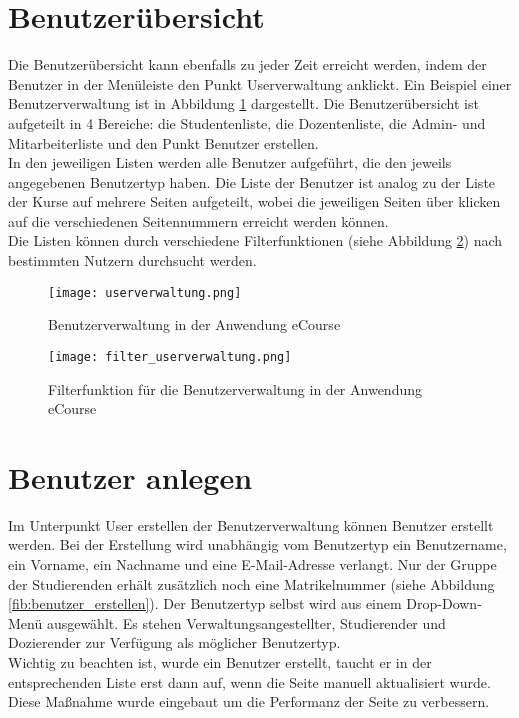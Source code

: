 \section{Benutzerübersicht}
Die Benutzerübersicht kann ebenfalls zu jeder Zeit erreicht werden, indem der Benutzer in der Menüleiste den Punkt \glqq Userverwaltung\grqq{} anklickt. Ein Beispiel einer Benutzerverwaltung ist in Abbildung \ref{fib:userverwaltung} dargestellt.
Die Benutzerübersicht ist aufgeteilt in 4 Bereiche: die Studentenliste, die Dozentenliste, die Admin- und Mitarbeiterliste und den Punkt Benutzer erstellen. \\
In den jeweiligen Listen werden alle Benutzer aufgeführt, die den jeweils angegebenen Benutzertyp haben. Die Liste der Benutzer ist analog zu der Liste der Kurse auf mehrere Seiten aufgeteilt, wobei die jeweiligen Seiten über klicken auf die verschiedenen Seitennummern erreicht werden können.\\
Die Listen können durch verschiedene Filterfunktionen (siehe Abbildung \ref{fib:filter}) nach bestimmten Nutzern durchsucht werden. 
\begin{figure}[h]
\centering
\texttt{[image: userverwaltung.png]}
\caption{Benutzerverwaltung in der Anwendung eCourse}
\label{fib:userverwaltung}
\end{figure}

\begin{figure}[h]
\centering
\texttt{[image: filter\_userverwaltung.png]}
\caption{Filterfunktion für die Benutzerverwaltung in der Anwendung eCourse}
\label{fib:filter}
\end{figure}


\section{Benutzer anlegen}
Im Unterpunkt \glqq User erstellen\grqq\: der Benutzerverwaltung können Benutzer erstellt werden. Bei der Erstellung wird unabhängig vom Benutzertyp ein Benutzername, ein Vorname, ein Nachname und eine E-Mail-Adresse verlangt. Nur der Gruppe der Studierenden erhält zusätzlich noch eine Matrikelnummer (siehe Abbildung \ref{fib:benutzer_erstellen}). Der Benutzertyp selbst wird aus einem Drop-Down-Menü ausgewählt. Es stehen Verwaltungsangestellter, Studierender und Dozierender zur Verfügung als möglicher Benutzertyp. \\
Wichtig zu beachten ist, wurde ein Benutzer erstellt, taucht er in der entsprechenden Liste erst dann auf, wenn die Seite manuell aktualisiert wurde. Diese Maßnahme wurde eingebaut um die Performanz der Seite zu verbessern.

